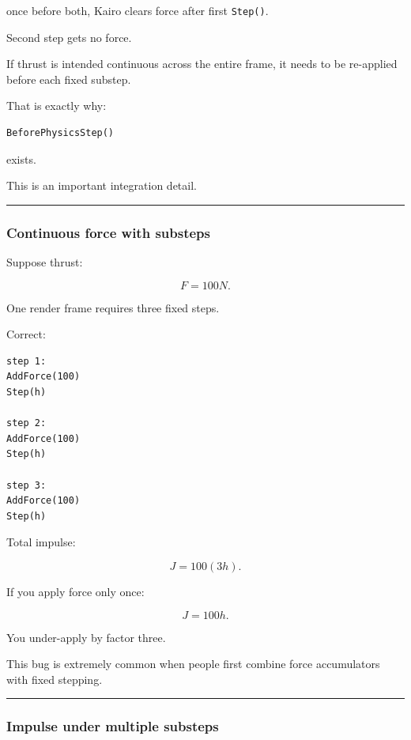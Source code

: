 once before both, Kairo clears force after first \texttt{Step()}.

Second step gets no force.

If thrust is intended continuous across the entire frame, it needs to be re-applied before each fixed substep.

That is exactly why:

\begin{verbatim}
BeforePhysicsStep()
\end{verbatim}

exists.

This is an important integration detail.

\begin{center}\rule{0.5\linewidth}{0.5pt}\end{center}

\subsubsection{Continuous force with substeps}\label{continuous-force-with-substeps}

Suppose thrust:

\[
F=100N.
\]

One render frame requires three fixed steps.

Correct:

\begin{verbatim}
step 1:
AddForce(100)
Step(h)

step 2:
AddForce(100)
Step(h)

step 3:
AddForce(100)
Step(h)
\end{verbatim}

Total impulse:

\[
J
=
100(3h).
\]

If you apply force only once:

\[
J
=
100h.
\]

You under-apply by factor three.

This bug is extremely common when people first combine force accumulators with fixed stepping.

\begin{center}\rule{0.5\linewidth}{0.5pt}\end{center}

\subsubsection{Impulse under multiple substeps}\label{impulse-under-multiple-substeps}

